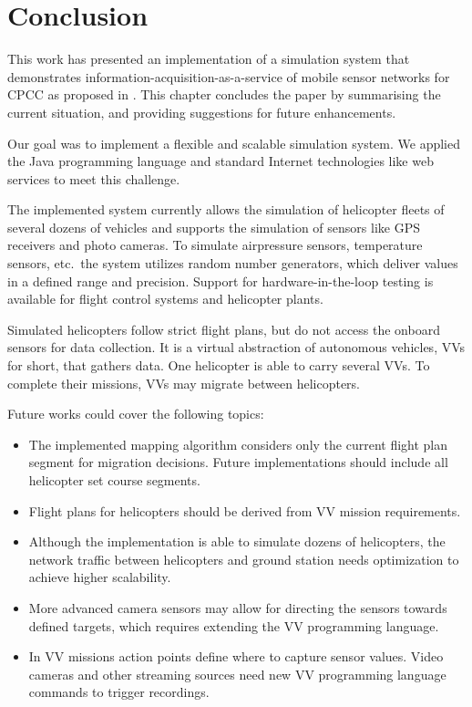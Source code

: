 
\chapter{Conclusion}

This work has presented an implementation of a simulation system that demonstrates information-acquisition-as-a-service
of mobile sensor networks for \ac{CPCC} as proposed in \cite{HotCloud10}.
%
This chapter concludes the paper by summarising the current situation, and providing suggestions for future
enhancements.

Our goal was to implement a flexible and scalable simulation system. We applied 
the Java programming language and standard Internet technologies like web services to meet this challenge.  

The implemented system currently allows the simulation of helicopter fleets of several dozens of vehicles
and supports the simulation of sensors like GPS receivers and photo cameras.
To simulate airpressure sensors, temperature sensors, etc.~the system utilizes random number generators, which
deliver values in a defined range and precision.
%
Support for hardware-in-the-loop testing is available for flight control systems and helicopter plants.
%

Simulated helicopters follow strict flight plans, but do not access the onboard sensors for data collection.
It is a virtual abstraction of autonomous vehicles, \acfp{VV} for short, that gathers data.
One helicopter is able to carry several \acp{VV}. To complete their missions, \acp{VV} may migrate between helicopters.


Future works could cover the following topics:
\begin{itemize}
  \item The implemented mapping algorithm considers only the current flight plan segment for migration decisions.
  	Future implementations should include all helicopter set course segments.
   
   \item Flight plans for helicopters should be derived from \ac{VV} mission requirements. 
   
   \item Although the implementation is able to simulate dozens of helicopters, the network traffic between
   	helicopters and ground station needs optimization to achieve higher scalability.
   
   \item More advanced camera sensors may allow for directing the sensors towards defined targets, which requires
   	extending the \ac{VV} programming language.
   
   \item In \ac{VV} missions action points define where to capture sensor values. Video cameras  
   	and other streaming sources need new \ac{VV} programming language commands to trigger recordings.

\end{itemize}


